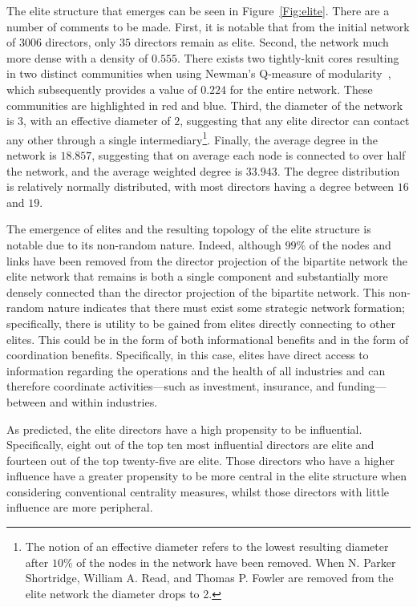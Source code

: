 The elite structure that emerges can be seen in Figure~\ref{Fig:elite}. There are a number of comments to be made. First, it is notable that from the initial network of $3006$ directors, only $35$ directors remain as elite. Second, the network much more dense with a density of $0.555$. There exists two tightly-knit cores resulting in two distinct communities when using Newman's Q-measure of modularity~\citep{Newman2006}, which subsequently provides a value of $0.224$ for the entire network. These communities are highlighted in red and blue. Third, the diameter of the network is $3$, with an effective diameter of $2$, suggesting that any elite director can contact any other through a single intermediary\footnote{The notion of an effective diameter refers to the lowest resulting diameter after $10\%$ of the nodes in the network have been removed. When N. Parker Shortridge, William A. Read, and Thomas P. Fowler are removed from the elite network the diameter drops to 2.}. Finally, the average degree in the network is $18.857$, suggesting that on average each node is connected to over half the network, and the average weighted degree is $33.943$. The degree distribution is relatively normally distributed, with most directors having a degree between $16$ and $19$.

The emergence of elites and the resulting topology of the elite structure is notable due to its non-random nature. Indeed, although $99\%$ of the nodes and links have been removed from the director projection of the bipartite network the elite network that remains is both a single component and substantially more densely connected than the director projection of the bipartite network. This non-random nature indicates that there must exist some strategic network formation; specifically, there is utility to be gained from elites directly connecting to other elites. This could be in the form of both informational benefits and in the form of coordination benefits. Specifically, in this case, elites have direct access to information regarding the operations and the health of all industries and can therefore coordinate activities---such as investment, insurance, and funding---between and within industries.

As predicted, the elite directors have a high propensity to be influential. Specifically, eight out of the top ten most influential directors are elite and fourteen out of the top twenty-five are elite. Those directors who have a higher influence have a greater propensity to be more central in the elite structure when considering conventional centrality measures, whilst those directors with little influence are more peripheral.

